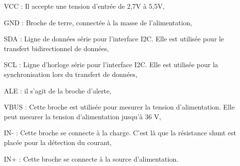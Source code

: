 
\begin{filleditem}
	\item 	VCC : Il accepte une tension d'entrée de 2,7V à 5,5V,
	\item GND : Broche de terre, connectée à la masse de l'alimentation,
	\item SDA : Ligne de données série pour l'interface I2C. Elle est utilisée pour le transfert bidirectionnel de données,
	\item SCL : Ligne d'horloge série pour l'interface I2C. Elle est utilisée pour la synchronisation lors du transfert de données,
	\item ALE : il s'agit de la broche d'alerte,
	\item VBUS : Cette broche est utilisée pour mesurer la tension d'alimentation. Elle peut mesurer la tension d'alimentation jusqu'à 36 V,
	\item IN- : Cette broche se connecte à la charge. C'est là que la  résistance shunt est placée pour la détection du courant,
	\item IN+ : Cette broche se connecte à la source d'alimentation.\\
\end{filleditem}

	
